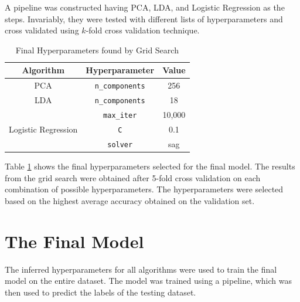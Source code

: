\documentclass[conference]{IEEEtran}
\begin{document}
    A pipeline was constructed having PCA, LDA, and Logistic Regression as the steps.
    Invariably, they were tested with different lists of hyperparameters and cross validated using $k$-fold cross validation technique.

    \begin{table}[htbp]
        \caption{Final Hyperparameters found by Grid Search}
        \begin{center}
            \begin{tabular}{|c|c|c|}
                \hline
                \textbf{Algorithm} & \textbf{Hyperparameter} & \textbf{Value} \\
                \hline
                PCA & \texttt{n\_components} & 256 \\
                \hline
                LDA & \texttt{n\_components} & 18 \\
                \hline
                 & \texttt{max\_iter} & 10,000 \\
                \cline{2-3}
                Logistic Regression & \texttt{C} & 0.1 \\
                \cline{2-3}
                & \texttt{solver} & sag \\
                \hline
            \end{tabular}
            \label{tab:hyperparams}
        \end{center}
    \end{table}

    Table \ref{tab:hyperparams} shows the final hyperparameters selected for the final model.
    The results from the grid search were obtained after 5-fold cross validation on each combination of possible hyperparameters.
    The hyperparameters were selected based on the highest average accuracy obtained on the validation set.

    \section{The Final Model}
    \label{sec:finalmodel}
    The inferred hyperparameters for all algorithms were used to train the final model on the entire dataset.
    The model was trained using a pipeline, which was then used to predict the labels of the testing dataset.
\end{document}
